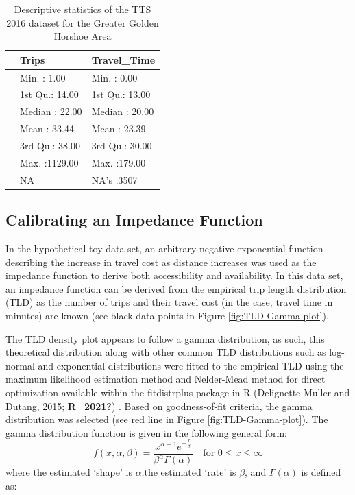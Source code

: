 \documentclass[]{elsarticle} %
\begin{document}
\begin{table}

\caption{\label{tab:unnamed-chunk-1}\label{tab:TTS-16-desc-stats}Descriptive statistics of the TTS 2016 dataset for the Greater Golden Horshoe Area}
\centering
\begin{tabular}[t]{l|l|l}
\hline
  & Trips & Travel\_Time\\
\hline
 & Min.   :   1.00 & Min.   :  0.00\\
\hline
 & 1st Qu.:  14.00 & 1st Qu.: 13.00\\
\hline
 & Median :  22.00 & Median : 20.00\\
\hline
 & Mean   :  33.44 & Mean   : 23.39\\
\hline
 & 3rd Qu.:  38.00 & 3rd Qu.: 30.00\\
\hline
 & Max.   :1129.00 & Max.   :179.00\\
\hline
 & NA & NA's   :3507\\
\hline
\end{tabular}
\end{table}

\hypertarget{calibrating-an-impedance-function}{%
\subsection{Calibrating an Impedance
Function}\label{calibrating-an-impedance-function}}

In the hypothetical toy data set, an arbitrary negative exponential
function describing the increase in travel cost as distance increases
was used as the impedance function to derive both accessibility and
availability. In this data set, an impedance function can be derived
from the empirical trip length distribution (TLD) as the number of trips
and their travel cost (in the case, travel time in minutes) are known
(see black data points in Figure \ref{fig:TLD-Gamma-plot}).

The TLD density plot appears to follow a gamma distribution, as such,
this theoretical distribution along with other common TLD distributions
such as log-normal and exponential distributions were fitted to the
empirical TLD using the maximum likelihood estimation method and
Nelder-Mead method for direct optimization available within the
fitdistrplus package in R (Delignette-Muller and Dutang, 2015;
\textbf{R\_2021?}) . Based on goodness-of-fit criteria, the gamma
distribution was selected (see red line in Figure
\ref{fig:TLD-Gamma-plot}). The gamma distribution function is given in
the following general form: \[ 
f(x, \alpha, \beta) = \frac {x^{\alpha-1}e^{-\frac{x}{\beta}}}{ \beta^{\alpha}\Gamma(\alpha)} \quad \text{for } 0 \leq x \leq \infty
\] \noindent where the estimated `shape' is \(\alpha\),the estimated
`rate' is \(\beta\), and \(\Gamma(\alpha)\) is defined as:
\end{document}
